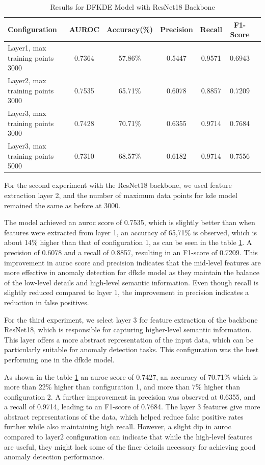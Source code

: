 \begin{table}[ht!]
    \centering
    \begin{tabular}{|l|c|c|c|c|c|c|}
        \hline
        \textbf{Configuration} & \textbf{AUROC} & \textbf{Accuracy(\%)} & \textbf{Precision} & \textbf{Recall} & \textbf{F1-Score} \\ \hline
        Layer1, max training points 3000 & 0.7364 & 57.86\% & 0.5447 & 0.9571 & 0.6943 \\ \hline
        Layer2, max training points 3000 & 0.7535 & 65.71\% & 0.6078 & 0.8857 & 0.7209 \\ \hline
        Layer3, max training points 3000 & 0.7428 & 70.71\% & 0.6355 & 0.9714 & 0.7684 \\ \hline
        Layer3, max training points 5000 & 0.7310 & 68.57\% & 0.6182 & 0.9714 & 0.7556 \\ \hline
    \end{tabular}
    \caption{Results for DFKDE Model with ResNet18 Backbone}
    \label{tab:dfkde resnet18 results}
\end{table}

For the second experiment with the ResNet18 backbone, we used feature extraction layer 2, and the number of maximum data points for \gls{kde} model remained the same as before at 3000.

The model achieved an \gls{auroc} score of 0.7535, which is slightly better than when features were extracted from layer 1, an accuracy of 65,71\% is observed, which is about 14\% higher than that of configuration 1, as can be seen in the table \ref{tab:dfkde resnet18 results}. A precision of 0.6078 and a recall of 0.8857, resulting in an F1-score of 0.7209. This improvement in \gls{auroc} score and precision indicates that the mid-level features are more effective in anomaly detection for \gls{dfkde} model as they maintain the balance of the low-level details and high-level semantic information. Even though recall is slightly reduced compared to layer 1, the improvement in precision indicates a reduction in false positives.

For the third experiment, we select layer 3 for feature extraction of the backbone ResNet18, which is responsible for capturing higher-level semantic information. This layer offers a more abstract representation of the input data, which can be particularly suitable for anomaly detection tasks. This configuration was the best performing one in the \gls{dfkde} model.

As shown in the table \ref{tab:dfkde resnet18 results} an \gls{auroc} score of 0.7427, an accuracy of 70.71\% which is more than 22\% higher than configuration 1, and more than 7\% higher than configuration 2. A further improvement in precision was observed at 0.6355, and a recall of 0.9714, leading to an F1-score of 0.7684. The layer 3 features give more abstract representations of the data, which helped reduce false positive rates further while also maintaining high recall. However, a slight dip in \gls{auroc} compared to layer2 configuration can indicate that while the high-level features are useful, they might lack some of the finer details necessary for achieving good anomaly detection performance.

